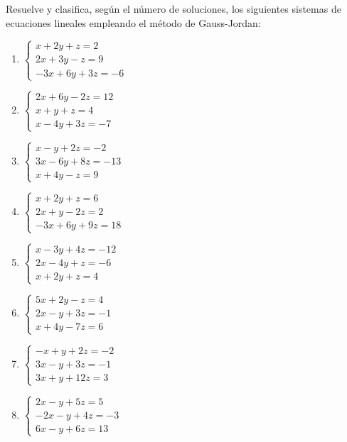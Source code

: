 \Exercicio Resuelve y clasifica, según el número de soluciones, los siguientes sistemas de ecuaciones lineales empleando el método de Gauss-Jordan:

\begin{enumerate}[topsep=0pt]
	\item $ \begin{cases}
		x + 2y + z = 2 \\
		2x + 3y - z = 9 \\
		-3x + 6y + 3z = -6
	\end{cases} $
	
	\item $ \begin{cases}
		2x+6y - 2z = 12 \\
		x+y+z = 4 \\
		x - 4y + 3z = -7
	\end{cases} $
	
	\item $ \begin{cases}
		x-y+2z = -2 \\
		3x-6y+8z = -13 \\
		x+4y - z = 9
	\end{cases} $
	
	\item $ \begin{cases}
		x+2y + z = 6 \\
		2x+y-2z = 2 \\
		-3x + 6y + 9z = 18
	\end{cases} $

	\item $\begin{cases}
		x - 3y + 4z = -12 \\
		2x-4y + z = -6 \\
		x+2y+z = 4
	\end{cases} $
	
	\item $ \begin{cases}
		5x+2y-z=4 \\
		2x-y+3z = -1 \\
		x+4y-7z = 6
	\end{cases} $
	
	\item $ \begin{cases}
		-x + y +2z = -2 \\
		3x-y+3z = -1 \\
		3x+y+12z = 3
	\end{cases} $
	
	\item $ \begin{cases}
		2x - y + 5z = 5 \\
		-2x -y + 4z = -3 \\
		6x -y + 6z = 13
	\end{cases} $
	

\end{enumerate}
